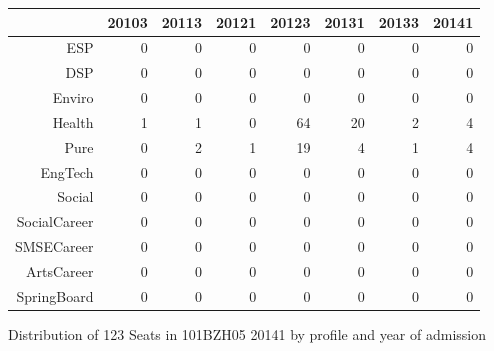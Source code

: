 \documentclass{article}\usepackage[]{graphicx}\usepackage[]{color}
\makeatletter
\newenvironment{kframe}{%
 \def\at@end@of@kframe{}%
 \ifinner\ifhmode%
  \def\at@end@of@kframe{\end{minipage}}%
  \begin{minipage}{\columnwidth}%
 \fi\fi%
 \def\FrameCommand##1{\hskip\@totalleftmargin \hskip-\fboxsep
 \colorbox{shadecolor}{##1}\hskip-\fboxsep
     \hskip-\linewidth \hskip-\@totalleftmargin \hskip\columnwidth}%
 \MakeFramed {\advance\hsize-\width
   \@totalleftmargin\z@ \linewidth\hsize
   \@setminipage}}%
 {\par\unskip\endMakeFramed%
 \at@end@of@kframe}
\makeatother
\begin{document}
\begin{figure}[H]
\centering
\begin{tabular}{rrrrrrrr}
  \hline
 & 20103 & 20113 & 20121 & 20123 & 20131 & 20133 & 20141 \\ 
  \hline
ESP &   0 &   0 &   0 &   0 &   0 &   0 &   0 \\ 
  DSP &   0 &   0 &   0 &   0 &   0 &   0 &   0 \\ 
  Enviro &   0 &   0 &   0 &   0 &   0 &   0 &   0 \\ 
  Health &   1 &   1 &   0 &  64 &  20 &   2 &   4 \\ 
  Pure &   0 &   2 &   1 &  19 &   4 &   1 &   4 \\ 
  EngTech &   0 &   0 &   0 &   0 &   0 &   0 &   0 \\ 
  Social &   0 &   0 &   0 &   0 &   0 &   0 &   0 \\ 
  SocialCareer &   0 &   0 &   0 &   0 &   0 &   0 &   0 \\ 
  SMSECareer &   0 &   0 &   0 &   0 &   0 &   0 &   0 \\ 
  ArtsCareer &   0 &   0 &   0 &   0 &   0 &   0 &   0 \\ 
  SpringBoard &   0 &   0 &   0 &   0 &   0 &   0 &   0 \\ 
   \hline
\end{tabular}
\caption{Distribution of 123 Seats in 101BZH05 20141 by profile and year of admission} 
\end{figure}
\begin{kframe}

{\ttfamily\noindent\bfseries\color{errorcolor}{\#\# Error in characters | factors: operations are possible only for numeric, logical or complex types}}\end{kframe}
\end{document}
